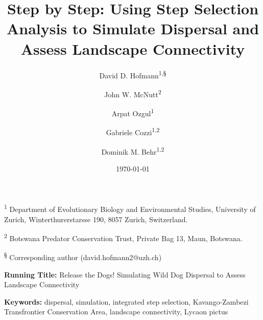 \documentclass[abstract=on,10pt,a4paper,bibliography=totocnumbered]{article}
\title{Step by Step: Using Step Selection Analysis to Simulate Dispersal and
Assess Landscape Connectivity}
\author{
  David D. Hofmann\textsuperscript{1,\S} \and
  John W. McNutt\textsuperscript{2} \and
  Arpat Ozgul\textsuperscript{1} \and
  Gabriele Cozzi\textsuperscript{1,2} \and
  Dominik M. Behr\textsuperscript{1,2}
}
\date{\today}
\begin{document}



\maketitle

\begin{flushleft}

\vspace{0.5cm}

\textsuperscript{1} Department of Evolutionary Biology and Environmental
Studies, University of Zurich, Winterthurerstarsse 190, 8057 Zurich,
Switzerland.

\textsuperscript{2} Botswana Predator Conservation Trust, Private Bag 13, Maun,
Botswana.

\textsuperscript{\S} Corresponding author (david.hofmann2@uzh.ch)

\vspace{4cm}

\textbf{Running Title:} Release the Dogs! Simulating Wild Dog Dispersal to
Assess Landscape Connectivity

\vspace{0.5cm}

\textbf{Keywords:} dispersal, simulation, integrated step selection,
Kavango-Zambezi Transfrontier Conservation Area, landscape connectivity, Lycaon
pictus

\end{flushleft}
\end{document}
